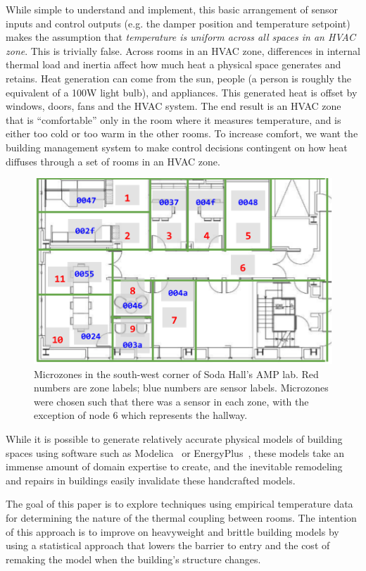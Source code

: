 While simple to understand and implement, this basic arrangement of sensor inputs and control outputs (e.g. the damper position and temperature setpoint) makes the assumption that \emph{temperature is uniform across all spaces in an HVAC zone}.
This is trivially false. 
Across rooms in an HVAC zone, differences in internal thermal load and inertia affect how much heat a physical space generates and retains.
Heat generation can come from the sun, people (a person is roughly the equivalent of a 100W light bulb), and appliances.
This generated heat is offset by windows, doors, fans and the HVAC system.
The end result is an HVAC zone that is ``comfortable'' only in the room where it measures temperature, and is either too cold or too warm in the other rooms.
To increase comfort, we want the building management system to make control decisions contingent on how heat diffuses through a set of rooms in an HVAC zone.

\begin{figure}[!ht]
\centering
\includegraphics[width=.5\linewidth]{figs/Soda_AMP_microzones}
\caption{Microzones in the south-west corner of Soda Hall's AMP lab. Red numbers are zone labels; blue numbers are sensor labels. Microzones were chosen such that there was a sensor in each zone, with the exception of node 6 which represents the hallway.}
\label{fig:soda_amp_microzones}
\end{figure}


While it is possible to generate relatively accurate physical models of building spaces using software such as Modelica~\cite{fritzson2010principles} or EnergyPlus~\cite{energyplus}, these models take an immense amount of domain expertise to create, and the inevitable remodeling and repairs in buildings easily invalidate these handcrafted models.

The goal of this paper is to explore techniques using empirical temperature data for determining the nature of the thermal coupling between rooms.
The intention of this approach is to improve on heavyweight and brittle building models by using a statistical approach that lowers the barrier to entry and the cost of remaking the model when the building's structure changes.



